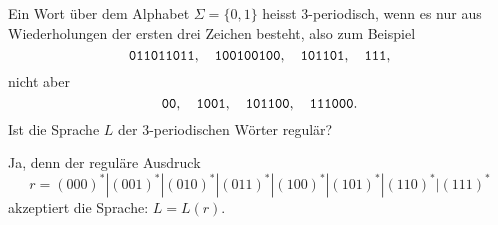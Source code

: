 Ein Wort über dem Alphabet $\Sigma=\{0,1\}$ heisst
3-periodisch, wenn es nur aus Wiederholungen der ersten drei Zeichen besteht,
also zum Beispiel
\[
\text{\tt 011011011},\quad
\text{\tt 100100100},\quad
\text{\tt 101101},\quad
\text{\tt 111},
\]
nicht aber
\[
\text{\tt 00},\quad
\text{\tt 1001},\quad
\text{\tt 101100},\quad
\text{\tt 111000}.
\]
Ist die Sprache $L$ der 3-periodischen Wörter regulär?

\begin{loesung}
Ja, denn der reguläre Ausdruck
\[
r=(000)^*|
(001)^*|
(010)^*|
(011)^*|
(100)^*|
(101)^*|
(110)^*|
(111)^*
\]
akzeptiert die Sprache: $L=L(r)$.
\end{loesung}
